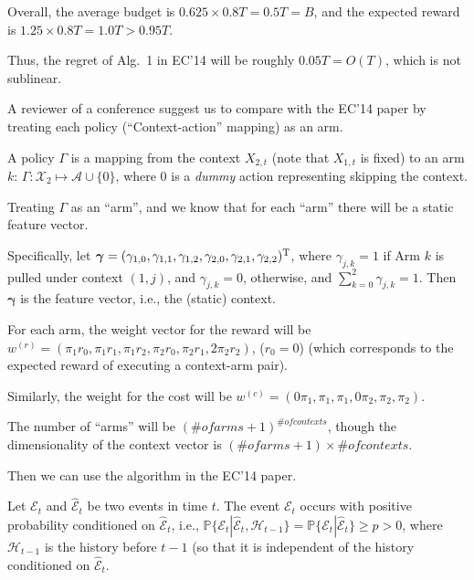 Overall, the average budget is $0.625 \times 0.8 T= 0.5 T= B$, and the expected reward is $1.25 \times 0.8 T = 1.0T > 0.95T$.

Thus, the regret of Alg.~1 in EC'14 will be roughly $0.05T = O(T)$, which is not sublinear.


 A reviewer of a conference suggest us to compare with the EC'14 paper by treating each policy (``Context-action'' mapping) as an arm.

A policy $\Gamma$ is a mapping from the context $X_{2,t}$ (note that $X_{1,t}$ is fixed) to an arm $k$: $\Gamma: \mathcal{X}_2 \mapsto \mathcal{A}\cup\{0\}$, where 0 is a \emph{dummy} action representing skipping the context.

Treating $\Gamma$ as an ``arm'', and we know that for each ``arm'' there will be a static feature vector.

Specifically, let $\boldsymbol{\gamma} = (\gamma_{1, 0}, \gamma_{1,1}, \gamma_{1,2}, \gamma_{2,0}, \gamma_{2,1}, \gamma_{2,2})^{\rm T}$, where $\gamma_{j,k} = 1$ if Arm $k$ is pulled under context $(1,j)$, and $\gamma_{j,k} = 0$, otherwise, and $\sum_{k=0}^2\gamma_{j,k} = 1$.
Then $\boldsymbol{\gamma}$ is the feature vector, i.e., the (static) context.

For each arm, the weight vector for the reward will be $w^{(r)} = (\pi_1 r_0, \pi_1 r_1, \pi_1 r_2, \pi_2 r_0, \pi_2 r_1, 2\pi_2 r_2)$, ($r_0 = 0$) (which corresponds to the expected reward of executing  a context-arm pair).

Similarly, the weight for the cost will be $w^{(c)} = (0\pi_1 , \pi_1, \pi_1, 0\pi_2, \pi_2, \pi_2)$.

The number of ``arms'' will be $(\# of arms +1)^{\# of contexts}$, though the dimensionality of the context vector is $(\# of arms +1) \times \# of contexts$.

Then we can use the algorithm in the EC'14 paper.



\newpage

Let $\mathcal{E}_{t}$ and $\hat{\mathcal{E}}_{t}$ be two events in time $t$. The event $\mathcal{E}_{t}$ occurs with positive probability conditioned on $\hat{\mathcal{E}}_{t}$, i.e., $\mathbb{P}\{\mathcal{E}_{t}|\hat{\mathcal{E}}_{t}, \mathcal{H}_{t-1}\} = \mathbb{P}\{\mathcal{E}_{t}|\hat{\mathcal{E}}_{t}\} \geq p > 0$, where $\mathcal{H}_{t-1}$ is the history before $t-1$ (so that it is independent of the history conditioned on $\hat{\mathcal{E}}_{t}$.

